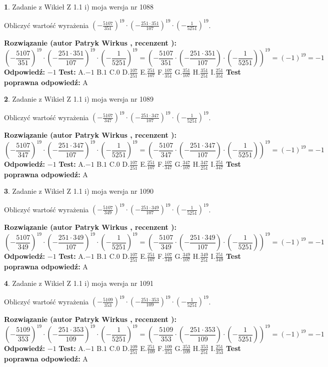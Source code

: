 \documentclass[12pt, a4paper]{article}
\theoremstyle{definition} %
\newtheorem{zad}{}
\newcommand{\zadStart}[1]{\begin{zad}#1\newline}
\newcommand{\zadStop}{\end{zad}}
\newcommand{\rozwStart}[2]{\noindent \textbf{Rozwiązanie (autor #1 , recenzent #2): }\newline}
\newcommand{\rozwStop}{\newline}
\newcommand{\odpStart}{\noindent \textbf{Odpowiedź:}\newline}
\newcommand{\odpStop}{\newline}
\newcommand{\testStart}{\noindent \textbf{Test:}\newline}
\newcommand{\testStop}{\newline}
\newcommand{\kluczStart}{\noindent \textbf{Test poprawna odpowiedź:}\newline}
\newcommand{\kluczStop}{\newline}
\begin{document}
\zadStart{Zadanie z Wikieł Z 1.1 i) moja wersja nr 1088}

Obliczyć wartość wyrażenia $(-\frac{5107}{351})^{19} \cdot (-\frac{251 \cdot 351}{107})^{19} \cdot (-\frac{1}{5251})^{19}$.
\zadStop
\rozwStart{Patryk Wirkus}{}
$$(-\frac{5107}{351})^{19} \cdot (-\frac{251 \cdot 351}{107})^{19} \cdot (-\frac{1}{5251})^{19} = (-\frac{5107}{351} \cdot (-\frac{251 \cdot 351}{107}) \cdot (-\frac{1}{5251}))^{19} = (-1)^{19} = -1$$
\rozwStop
\odpStart
$-1$
\odpStop
\testStart
A.$-1$ B.$1$ C.$0$ D.$\frac{107}{251}$ E.$\frac{251}{107}$
F.$\frac{107}{351}$ G.$\frac{351}{107}$
H.$\frac{351}{251}$
I.$\frac{251}{351}$
\testStop
\kluczStart
A
\kluczStop



\zadStart{Zadanie z Wikieł Z 1.1 i) moja wersja nr 1089}

Obliczyć wartość wyrażenia $(-\frac{5107}{347})^{19} \cdot (-\frac{251 \cdot 347}{107})^{19} \cdot (-\frac{1}{5251})^{19}$.
\zadStop
\rozwStart{Patryk Wirkus}{}
$$(-\frac{5107}{347})^{19} \cdot (-\frac{251 \cdot 347}{107})^{19} \cdot (-\frac{1}{5251})^{19} = (-\frac{5107}{347} \cdot (-\frac{251 \cdot 347}{107}) \cdot (-\frac{1}{5251}))^{19} = (-1)^{19} = -1$$
\rozwStop
\odpStart
$-1$
\odpStop
\testStart
A.$-1$ B.$1$ C.$0$ D.$\frac{107}{251}$ E.$\frac{251}{107}$
F.$\frac{107}{347}$ G.$\frac{347}{107}$
H.$\frac{347}{251}$
I.$\frac{251}{347}$
\testStop
\kluczStart
A
\kluczStop



\zadStart{Zadanie z Wikieł Z 1.1 i) moja wersja nr 1090}

Obliczyć wartość wyrażenia $(-\frac{5107}{349})^{19} \cdot (-\frac{251 \cdot 349}{107})^{19} \cdot (-\frac{1}{5251})^{19}$.
\zadStop
\rozwStart{Patryk Wirkus}{}
$$(-\frac{5107}{349})^{19} \cdot (-\frac{251 \cdot 349}{107})^{19} \cdot (-\frac{1}{5251})^{19} = (-\frac{5107}{349} \cdot (-\frac{251 \cdot 349}{107}) \cdot (-\frac{1}{5251}))^{19} = (-1)^{19} = -1$$
\rozwStop
\odpStart
$-1$
\odpStop
\testStart
A.$-1$ B.$1$ C.$0$ D.$\frac{107}{251}$ E.$\frac{251}{107}$
F.$\frac{107}{349}$ G.$\frac{349}{107}$
H.$\frac{349}{251}$
I.$\frac{251}{349}$
\testStop
\kluczStart
A
\kluczStop



\zadStart{Zadanie z Wikieł Z 1.1 i) moja wersja nr 1091}

Obliczyć wartość wyrażenia $(-\frac{5109}{353})^{19} \cdot (-\frac{251 \cdot 353}{109})^{19} \cdot (-\frac{1}{5251})^{19}$.
\zadStop
\rozwStart{Patryk Wirkus}{}
$$(-\frac{5109}{353})^{19} \cdot (-\frac{251 \cdot 353}{109})^{19} \cdot (-\frac{1}{5251})^{19} = (-\frac{5109}{353} \cdot (-\frac{251 \cdot 353}{109}) \cdot (-\frac{1}{5251}))^{19} = (-1)^{19} = -1$$
\rozwStop
\odpStart
$-1$
\odpStop
\testStart
A.$-1$ B.$1$ C.$0$ D.$\frac{109}{251}$ E.$\frac{251}{109}$
F.$\frac{109}{353}$ G.$\frac{353}{109}$
H.$\frac{353}{251}$
I.$\frac{251}{353}$
\testStop
\kluczStart
A
\kluczStop
\end{document}
